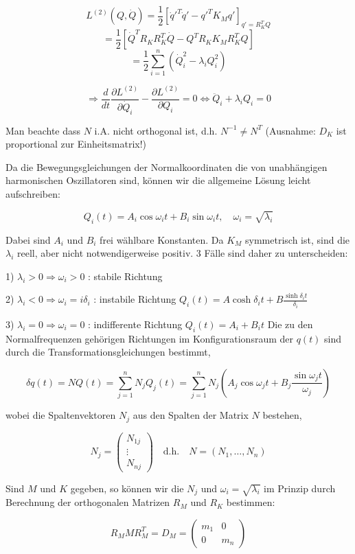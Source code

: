 \documentclass[10pt, letterpaper]{article}
\newcommand{\N}{\mathbb{N}}
\begin{document}
\[L^{(2)}(Q,\dot{Q})=\frac{1}{2}\left[\dot{q}'^T\dot{q}'-q'^T K_M q'\right]_{q'=R_K^T Q}\]
\[=\frac{1}{2}\left[\dot{Q}^T R_K R_K^T \dot{Q} - Q^T R_K K_M R_K^T Q\right]\]
\[=\frac{1}{2}\sum_{i=1}^n(\dot{Q}_i^2-\lambda_i Q_i^2)\]

\[\Rightarrow \frac{d}{dt}\frac{\partial L^{(2)}}{\partial\dot{Q}_i}-\frac{\partial L^{(2)}}{\partial Q_i}=0 \Leftrightarrow \ddot{Q}_i+\lambda_i Q_i=0\]

Man beachte dass $N$ i.A. nicht orthogonal ist, d.h. $N^{-1}\neq N^T$ (Ausnahme: $D_K$ ist proportional zur Einheitsmatrix!)

Da die Bewegungsgleichungen der Normalkoordinaten die von unabhängigen harmonischen Oszillatoren sind, können wir die allgemeine Lösung leicht aufschreiben:

\[\boxed{Q_i(t)=A_i\cos\omega_i t + B_i\sin\omega_i t, \quad \omega_i=\sqrt{\lambda_i}}\]




Dabei sind $A_i$ und $B_i$ frei wählbare Konstanten. Da $K_M$ symmetrisch ist, sind die $\lambda_i$ reell, aber nicht notwendigerweise positiv. 3 Fälle sind daher zu unterscheiden:

1) $\lambda_i>0 \Rightarrow \omega_i>0$ : stabile Richtung

2) $\lambda_i<0 \Rightarrow \omega_i=i\delta_i$ : instabile Richtung
   $Q_i(t)=A\cosh\delta_i t + B\frac{\sinh\delta_i t}{\delta_i}$

3) $\lambda_i=0 \Rightarrow \omega_i=0$ : indifferente Richtung
   $Q_i(t)=A_i+B_i t$
Die zu den Normalfrequenzen gehörigen Richtungen im Konfigurationsraum der $q(t)$ sind durch die Transformationsgleichungen bestimmt,

\[\delta q(t)=NQ(t)=\sum_{j=1}^n N_j Q_j(t)=\sum_{j=1}^n N_j\left(A_j\cos\omega_jt+B_j\frac{\sin\omega_jt}{\omega_j}\right)\]

wobei die Spaltenvektoren $N_j$ aus den Spalten der Matrix $N$ bestehen,

\[N_j=\begin{pmatrix}N_{1j}\\\vdots\\N_{nj}\end{pmatrix} \quad \text{d.h.} \quad N=(N_1,\ldots,N_n)\]

Sind $M$ und $K$ gegeben, so können wir die $N_j$ und $\omega_i=\sqrt{\lambda_i}$ im Prinzip durch Berechnung der orthogonalen Matrizen $R_M$ und $R_K$ bestimmen:

\[R_M M R_M^T = D_M = \begin{pmatrix}m_1 & 0 \\ 0 & m_n\end{pmatrix} \tag{1}\]
\end{document}
